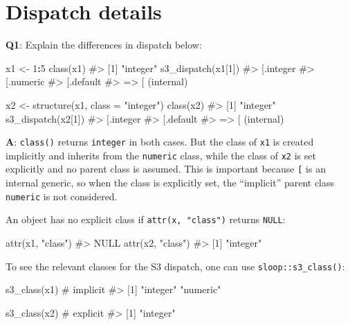 \documentclass[
]{krantz}
\makeatletter
\newenvironment{Shaded}{\begin{snugshade}}{\end{snugshade}}
\newcommand{\CommentTok}[1]{\textcolor[rgb]{0.56,0.35,0.01}{\textit{#1}}}
\newcommand{\DataTypeTok}[1]{\textcolor[rgb]{0.13,0.29,0.53}{#1}}
\newcommand{\DecValTok}[1]{\textcolor[rgb]{0.00,0.00,0.81}{#1}}
\newcommand{\KeywordTok}[1]{\textcolor[rgb]{0.13,0.29,0.53}{\textbf{#1}}}
\newcommand{\NormalTok}[1]{#1}
\newcommand{\OperatorTok}[1]{\textcolor[rgb]{0.81,0.36,0.00}{\textbf{#1}}}
\newcommand{\StringTok}[1]{\textcolor[rgb]{0.31,0.60,0.02}{#1}}
\newenvironment{kframe}{%
\medskip{}
\setlength{\fboxsep}{.8em}
 \def\at@end@of@kframe{}%
 \ifinner\ifhmode%
  \def\at@end@of@kframe{\end{minipage}}%
  \begin{minipage}{\columnwidth}%
 \fi\fi%
 \def\FrameCommand##1{\hskip\@totalleftmargin \hskip-\fboxsep
 \colorbox{shadecolor}{##1}\hskip-\fboxsep
     \hskip-\linewidth \hskip-\@totalleftmargin \hskip\columnwidth}%
 \MakeFramed {\advance\hsize-\width
   \@totalleftmargin\z@ \linewidth\hsize
   \@setminipage}}%
 {\par\unskip\endMakeFramed%
 \at@end@of@kframe}
\renewenvironment{Shaded}{\begin{kframe}}{\end{kframe}}
\renewcommand{\KeywordTok} [1]{\textcolor[rgb]{0.00,0.44,0.13}{{#1}}}
\renewcommand{\DataTypeTok}[1]{\textcolor[rgb]{0.56,0.13,0.00}{{#1}}}
\renewcommand{\DecValTok}  [1]{\textcolor[rgb]{0.25,0.63,0.44}{{#1}}}
\renewcommand{\StringTok}  [1]{\textcolor[rgb]{0.25,0.44,0.63}{{#1}}}
\renewcommand{\CommentTok} [1]{\textcolor[rgb]{0.38,0.63,0.69}{{#1}}}
\renewcommand{\NormalTok}  [1]{{#1}}
\makeatother
\begin{document}
\hypertarget{dispatch-details}{%
\section{Dispatch details}\label{dispatch-details}}

\textbf{{Q1}}: Explain the differences in dispatch below:

\begin{Shaded}
\begin{Highlighting}[]
\NormalTok{x1 <-}\StringTok{ }\DecValTok{1}\OperatorTok{:}\DecValTok{5}
\KeywordTok{class}\NormalTok{(x1)}
\CommentTok{#> [1] "integer"}
\KeywordTok{s3_dispatch}\NormalTok{(x1[}\DecValTok{1}\NormalTok{])}
\CommentTok{#>    [.integer}
\CommentTok{#>    [.numeric}
\CommentTok{#>    [.default}
\CommentTok{#> => [ (internal)}

\NormalTok{x2 <-}\StringTok{ }\KeywordTok{structure}\NormalTok{(x1, }\DataTypeTok{class =} \StringTok{"integer"}\NormalTok{)}
\KeywordTok{class}\NormalTok{(x2)}
\CommentTok{#> [1] "integer"}
\KeywordTok{s3_dispatch}\NormalTok{(x2[}\DecValTok{1}\NormalTok{])}
\CommentTok{#>    [.integer}
\CommentTok{#>    [.default}
\CommentTok{#> => [ (internal)}
\end{Highlighting}
\end{Shaded}

\textbf{{A}}: \texttt{class()} returns \texttt{integer} in both cases. But the class of \texttt{x1} is created implicitly and inherits from the \texttt{numeric} class, while the class of \texttt{x2} is set explicitly and no parent class is assumed. This is important because \texttt{{[}} is an internal generic, so when the class is explicitly set, the ``implicit'' parent class \texttt{numeric} is not considered.

An object has no explicit class if \texttt{attr(x,\ "class")} returns \texttt{NULL}:

\begin{Shaded}
\begin{Highlighting}[]
\KeywordTok{attr}\NormalTok{(x1, }\StringTok{"class"}\NormalTok{)}
\CommentTok{#> NULL}
\KeywordTok{attr}\NormalTok{(x2, }\StringTok{"class"}\NormalTok{)}
\CommentTok{#> [1] "integer"}
\end{Highlighting}
\end{Shaded}

To see the relevant classes for the S3 dispatch, one can use \texttt{sloop::s3\_class()}:

\begin{Shaded}
\begin{Highlighting}[]
\KeywordTok{s3_class}\NormalTok{(x1)  }\CommentTok{# implicit}
\CommentTok{#> [1] "integer" "numeric"}

\KeywordTok{s3_class}\NormalTok{(x2)  }\CommentTok{# explicit}
\CommentTok{#> [1] "integer"}
\end{Highlighting}
\end{Shaded}
\end{document}
